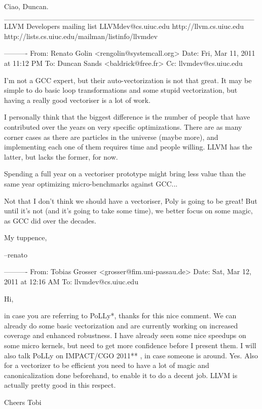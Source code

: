      Ciao, Duncan.
     _______________________________________________
     LLVM Developers mailing list
     LLVMdev@cs.uiuc.edu         http://llvm.cs.uiuc.edu
     http://lists.cs.uiuc.edu/mailman/listinfo/llvmdev

     ----------
     From: Renato Golin <rengolin@systemcall.org>
     Date: Fri, Mar 11, 2011 at 11:12 PM
     To: Duncan Sands <baldrick@free.fr>
     Cc: llvmdev@cs.uiuc.edu


     I'm not a GCC expert, but their auto-vectorization is not that great.
     It may be simple to do basic loop transformations and some stupid
     vectorization, but having a really good vectoriser is a lot of work.

     I personally think that the biggest difference is the number of people
     that have contributed over the years on very specific optimizations.
     There are as many corner cases as there are particles in the universe
     (maybe more), and implementing each one of them requires time and
     people willing. LLVM has the latter, but lacks the former, for now.

     Spending a full year on a vectoriser prototype might bring less value
     than the same year optimizing micro-benchmarks against GCC...

     Not that I don't think we should have a vectoriser, Poly is going to
     be great! But until it's not (and it's going to take some time), we
     better focus on some magic, as GCC did over the decades.

     My tuppence,

     --renato

     ----------
     From: Tobias Grosser <grosser@fim.uni-passau.de>
     Date: Sat, Mar 12, 2011 at 12:16 AM
     To: llvmdev@cs.uiuc.edu


     Hi,

     in case you are referring to PoLLy*, thanks for this nice comment. We
     can already do some basic vectorization and are currently working on
     increased coverage and enhanced robustness. I have already seen some
     nice speedups on some micro kernels, but need to get more confidence
     before I present them. I will also talk PoLLy on IMPACT/CGO 2011** , in
     case someone is around.
     Yes. Also for a vectorizer to be efficient you need to have a lot of
     magic and canonicalization done beforehand, to enable it to do a decent
     job. LLVM is actually pretty good in this respect.

     Cheers
     Tobi

